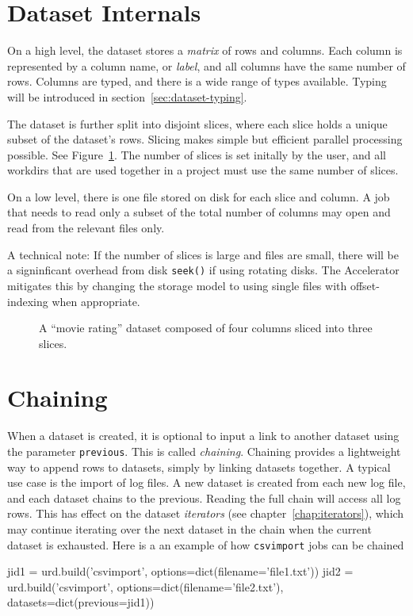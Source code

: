 \section{Dataset Internals}

On a high level, the dataset stores a \textsl{matrix} of rows and
columns.  Each column is represented by a column name,
or \emph{label}, and all columns have the same number of rows.
Columns are typed, and there is a wide range of types available.
Typing will be introduced in section~\ref{sec:dataset-typing}.

The dataset is further split into disjoint slices, where each slice
holds a unique subset of the dataset's rows.  Slicing makes simple but
efficient parallel processing possible.  See Figure~\ref{fig:slices}.
The number of slices is set initally by the user, and all workdirs
that are used together in a project must use the same number of
slices.

On a low level, there is one file stored on disk for each slice and
column.  A job that needs to read only a subset of the total number of
columns may open and read from the relevant files only.

A technical note: If the number of slices is large and files are
small, there will be a signinficant overhead from disk \texttt{seek()}
if using rotating disks.  The Accelerator mitigates this by changing
the storage model to using single files with offset-indexing when
appropriate.

\begin{figure}[b!]
  \begin{center}
     
     \caption{A ``movie rating'' dataset composed of four columns
              sliced into three slices.}
     \label{fig:slices}
  \end{center}
\end{figure}


\section{Chaining}
When a dataset is created, it is optional to input a link to another
dataset using the parameter \texttt{previous}.  This is called
\emph{chaining}.  Chaining provides a lightweight way to append rows
to datasets, simply by linking datasets together.  A typical use case
is the import of log files.  A new dataset is created from each new
log file, and each dataset chains to the previous.  Reading the full
chain will access all log rows.  This has effect on the dataset
\emph{iterators} (see chapter~\ref{chap:iterators}), which may continue iterating
over the next dataset in the chain when the current dataset is
exhausted.  Here is a an example of how \texttt{csvimport} jobs can be
chained
\begin{python}
jid1 = urd.build('csvimport', options=dict(filename='file1.txt'))
jid2 = urd.build('csvimport', options=dict(filename='file2.txt'),
                              datasets=dict(previous=jid1))
\end{python}



